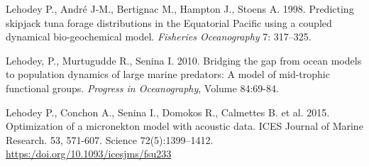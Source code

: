 

\begin{thebibliography}{}

 Lehodey P., André J-M., Bertignac M., Hampton J., Stoens A. 1998. Predicting skipjack tuna forage distributions in the Equatorial Pacific using a coupled dynamical bio-geochemical model. \textit {Fisheries Oceanography} 7: 317–325.

 Lehodey, P.,  Murtugudde R., Senina I. 2010. Bridging the gap from ocean models to population dynamics of large marine predators: A model of mid-trophic functional groups. \textit{Progress in Oceanography}, Volume 84:69-84.

 Lehodey P., Conchon A., Senina I., Domokos R., Calmettes B. et al. 2015. Optimization of a micronekton model with acoustic data. ICES Journal of Marine Research. 53, 571-607. Science 72(5):1399–1412. \url{https:/doi.org/10.1093/icesjms/fsu233}

\end{thebibliography}
